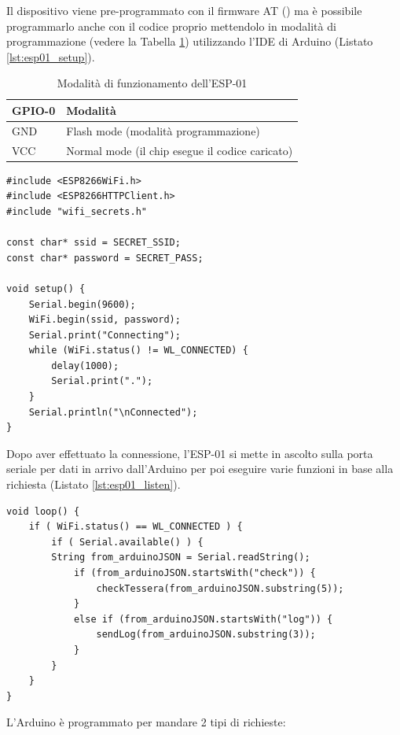 \documentclass[12pt]{report}
\begin{document}
Il dispositivo viene pre-programmato con il firmware AT  (\cite{at_fw}) ma è possibile programmarlo anche con il codice proprio mettendolo in modalità di programmazione (vedere la Tabella \ref{tab:esp01_modes}) utilizzando l'IDE di Arduino (Listato \ref{lst:esp01_setup}).

\begin{table}[H]
	\begin{center}
		\begin{tabular}{l|l} 
			\textbf{GPIO-0} & \textbf{Modalità} \\
			\hline
			GND & Flash mode (modalità programmazione) \\
			VCC & Normal mode (il chip esegue il codice caricato) \\
		\end{tabular}
		\caption{Modalità di funzionamento dell'ESP-01}
		\label{tab:esp01_modes}
	\end{center}
\end{table}
\begin{lstlisting}[caption={Riprogrammazione dell'ESP-01 con il codice proprio. All'accensione, il dispositivo non fa altro che connettersi alla rete WiFi locale. Per poter fare ciò, è stata utilizzata una libreria molto bene documentata (\url{https://arduino-esp8266.readthedocs.io/en/latest/esp8266wifi/readme.html})}, label={lst:esp01_setup}]
#include <ESP8266WiFi.h>
#include <ESP8266HTTPClient.h>
#include "wifi_secrets.h"

const char* ssid = SECRET_SSID;
const char* password = SECRET_PASS;

void setup() {
	Serial.begin(9600);
	WiFi.begin(ssid, password);
	Serial.print("Connecting");
	while (WiFi.status() != WL_CONNECTED) {
		delay(1000);
		Serial.print(".");
	}
	Serial.println("\nConnected");
}
\end{lstlisting}
Dopo aver effettuato la connessione, l'ESP-01 si mette in ascolto sulla porta seriale per dati in arrivo dall'Arduino per poi eseguire varie funzioni in base alla richiesta (Listato \ref{lst:esp01_listen}).

\pagebreak 

\begin{lstlisting}[caption={L'ESP-01 si mette in ascolto sulla porta seriale collegata all'Arduino. Esso chiama la funzione corretta in base al formato della stringa ricevuta.}, label={lst:esp01_listen}]
void loop() {
	if ( WiFi.status() == WL_CONNECTED ) {
		if ( Serial.available() ) {
		String from_arduinoJSON = Serial.readString();
			if (from_arduinoJSON.startsWith("check")) {
				checkTessera(from_arduinoJSON.substring(5));
			}
			else if (from_arduinoJSON.startsWith("log")) {
				sendLog(from_arduinoJSON.substring(3));
			}
		}
	}
}
\end{lstlisting}
L'Arduino è programmato per mandare 2 tipi di richieste:
\end{document}
